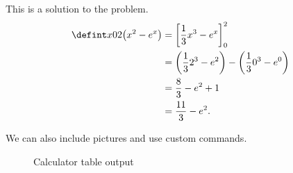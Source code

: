 This is a solution to the problem.
\begin{align*}
  \defint x 0 2 {\left( x^2 - e^x \right)} 
    &= \left[\frac 1 3 x^3 - e^x\right]_0^2 \\
    &= \left( \frac 1 3 2^3 - e^2 \right) - \left( \frac 1 3 0^3 - e^0 \right) \\
    &= \frac 8 3 - e^2 + 1 \\
    &= \frac {11} 3 - e^2.
\end{align*}


We can also include pictures and use custom commands.
\begin{figure}[hbp]
  \centering
  \caption{Calculator table output}
\end{figure}